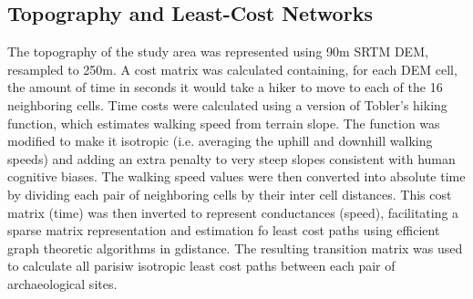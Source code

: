 \documentclass[fleqn,10pt]{wlscirep}
\begin{document}
\subsection*{Topography and Least-Cost Networks}
The topography of the study area was represented using 90m SRTM DEM, resampled to 250m. A cost matrix was calculated containing, for each DEM cell, the amount of time in seconds it would take a hiker to move to each of the 16 neighboring cells. Time costs were calculated using a version of Tobler's hiking function, which estimates walking speed from terrain slope. The function was modified to make it isotropic (i.e. averaging the uphill and downhill walking speeds) and adding an extra penalty to very steep slopes consistent with human cognitive biases. The walking speed values were then converted into absolute time by dividing each pair of neighboring cells by their inter cell distances. This cost matrix (time) was then inverted to represent conductances (speed), facilitating a sparse matrix representation and estimation fo least cost paths using efficient graph theoretic algorithms in gdistance. The resulting transition matrix was used to calculate all parisiw isotropic least cost paths between each pair of archaeological sites.

\end{document}
